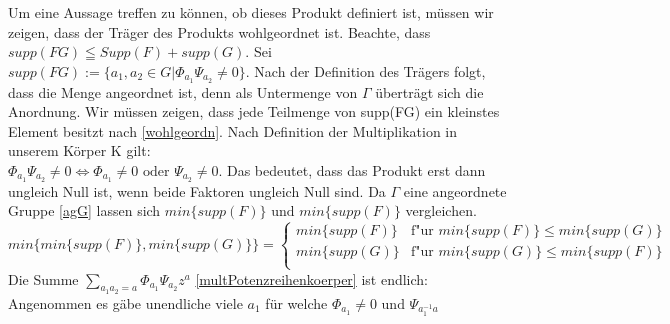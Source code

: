 Um eine Aussage treffen zu können, ob dieses Produkt definiert ist, müssen wir zeigen, dass der Träger des Produkts wohlgeordnet ist. Beachte, dass $supp(FG) \leqq Supp(F) + supp(G)$. Sei $supp(FG) := \lbrace a_1, a_2 \in G | \Phi_{a_1} \Psi_{a_2} \neq 0\rbrace.$ Nach der Definition des Trägers folgt, dass die Menge angeordnet ist, denn als Untermenge von $\Gamma$ überträgt sich die Anordnung. Wir müssen zeigen, dass jede Teilmenge von supp(FG) ein kleinstes Element besitzt nach \ref{wohlgeordn}. Nach Definition der Multiplikation in unserem Körper K gilt: \\
 $\Phi_{a_1} \Psi_{a_2} \neq 0 \Leftrightarrow \Phi_{a_1} \neq 0 \text{ oder } \Psi_{a_2} \neq 0 $. Das bedeutet, dass das Produkt erst dann ungleich Null ist, wenn beide Faktoren ungleich Null sind. Da $\Gamma$ eine angeordnete Gruppe \ref{agG} lassen sich $min\lbrace supp(F)\rbrace \text{ und } min\lbrace supp(F)\rbrace$ vergleichen.
\begin{equation}
   min \lbrace min\lbrace supp(F)\rbrace , min\lbrace supp(G)\rbrace \rbrace=
   \begin{cases}
     min\lbrace supp(F)\rbrace & \text{f"ur } min\lbrace supp(F)\rbrace \le min\lbrace supp(G)\rbrace \\
    min\lbrace supp(G)\rbrace & \text{f"ur } min\lbrace supp(G)\rbrace \le min\lbrace supp(F)\rbrace \\
   \end{cases}
\end{equation} %
%
Die Summe $\sum_{a_1  a_2 = a}^{}\Phi_{a_1} \Psi_{a_2} z^a$ \ref{multPotenzreihenkoerper} ist endlich: Angenommen es gäbe unendliche viele $a_1$ für welche $\Phi_{a_1} \neq 0 \text{ und } \Psi_{{a_1^{-1}}a} $
%
%

